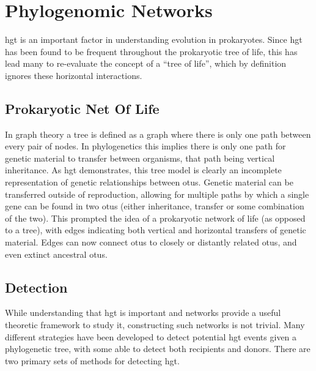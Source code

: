 \section*{Phylogenomic Networks}
\ac{hgt} is an important factor in understanding evolution in prokaryotes.
Since \ac{hgt} has been found to be frequent throughout the prokaryotic tree of life, this has lead many to re-evaluate the concept of a ``tree of life'', which by definition ignores these horizontal interactions\citep{netoflife}.
\subsection*{Prokaryotic Net Of Life}
In graph theory a tree is defined as a graph where there is only one path between every pair of nodes.
In phylogenetics this implies there is only one path for genetic material to transfer between organisms, that path being vertical inheritance.
As \ac{hgt} demonstrates, this tree model is clearly an incomplete representation of genetic relationships between \ac{otu}s.
Genetic material can be transferred outside of reproduction, allowing for multiple paths by which a single gene can be found in two \ac{otu}s (either inheritance, transfer or some combination of the two)\citep{lgt}.
This prompted the idea of a prokaryotic network of life (as opposed to a tree), with edges indicating both vertical and horizontal transfers of genetic material\citep{netoflife}.
Edges can now connect \ac{otu}s to closely or distantly related \ac{otu}s, and even extinct ancestral \ac{otu}s.
\subsection*{Detection}%
While understanding that \ac{hgt} is important and networks provide a useful theoretic framework to study it, constructing such networks is not trivial.
Many different strategies have been developed to detect potential \ac{hgt} events given a phylogenetic tree, with some able to detect both recipients and donors\citep{ihgt}.
There are two primary sets of methods for detecting \ac{hgt}.
